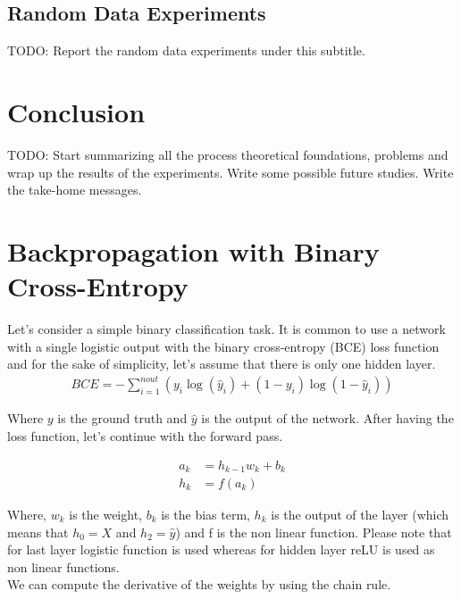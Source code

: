 \documentclass[a4paper, nobind]{templates/ociamthesis}
\begin{document}
\hypertarget{random-data-experiments}{%
\section{Random Data Experiments}\label{random-data-experiments}}

TODO: Report the random data experiments under this subtitle.

\hypertarget{chap:conc}{%
\chapter*{Conclusion}\label{chap:conc}}

TODO: Start summarizing all the process theoretical foundations, problems and wrap up the results of the experiments. Write some possible future studies. Write the take-home messages.

\startappendices

\hypertarget{chap:appendix_a}{%
\chapter{Backpropagation with Binary Cross-Entropy}\label{chap:appendix_a}}

Let's consider a simple binary classification task. It is common to use a network with a single logistic output with the binary cross-entropy (BCE) loss function and for the sake of simplicity, let's assume that there is only one hidden layer.
\[
\begin{aligned}
BCE=-\sum_{i=1}^{n o u t}\left(y_i \log \left(\hat{y}_i \right)+\left(1-y_i\right) \log \left(1-\hat{y}_i\right)\right)
\end{aligned}
\]

\noindent Where \(y\) is the ground truth and \(\hat{y}\) is the output of the network. After having the loss function, let's continue with the forward pass.

\[
\begin{aligned} 
a_{k} &= h_{k-1} w_{k} + b_k \\
h_k &= f(a_{k})
\end{aligned}
\]

\noindent Where, \(w_k\) is the weight, \(b_{k}\) is the bias term, \(h_k\) is the output of the layer (which means that \(h_0 = X\) and \(h_2 = \hat{y}\)) and f is the non linear function. Please note that for last layer logistic function is used whereas for hidden layer reLU is used as non linear functions.\\
We can compute the derivative of the weights by using the chain rule.
\end{document}
